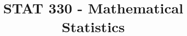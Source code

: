 



\title{STAT 330 - Mathematical Statistics}



\maketitle
\tableofcontents
\newpage























